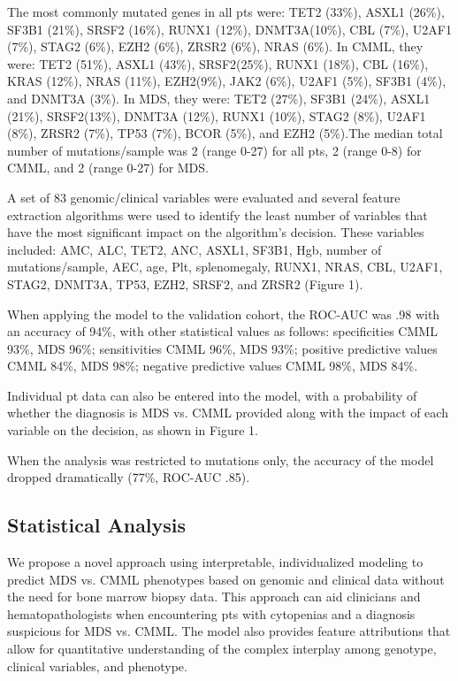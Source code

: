 The most commonly mutated genes in all pts were: TET2 (33\%), ASXL1 (26\%), SF3B1 (21\%), SRSF2 (16\%), RUNX1 (12\%), DNMT3A(10\%), CBL (7\%), U2AF1 (7\%), STAG2 (6\%), EZH2 (6\%), ZRSR2 (6\%), NRAS (6\%). In CMML, they were: TET2 (51\%), ASXL1 (43\%), SRSF2(25\%), RUNX1 (18\%), CBL (16\%), KRAS (12\%), NRAS (11\%), EZH2(9\%), JAK2 (6\%), U2AF1 (5\%), SF3B1 (4\%), and DNMT3A (3\%). In MDS, they were: TET2 (27\%), SF3B1 (24\%), ASXL1 (21\%), SRSF2(13\%), DNMT3A (12\%), RUNX1 (10\%), STAG2 (8\%), U2AF1 (8\%), ZRSR2 (7\%), TP53 (7\%), BCOR (5\%), and EZH2 (5\%).The median total number of mutations/sample was 2 (range 0-27) for all pts, 2 (range 0-8) for CMML, and 2 (range 0-27) for MDS.

A set of 83 genomic/clinical variables were evaluated and several feature extraction algorithms were used to identify the least number of variables that have the most significant impact on the algorithm's decision. These variables included: AMC, ALC, TET2, ANC, ASXL1, SF3B1, Hgb, number of mutations/sample, AEC, age, Plt, splenomegaly, RUNX1, NRAS, CBL, U2AF1, STAG2, DNMT3A, TP53, EZH2, SRSF2, and ZRSR2 (Figure 1).

When applying the model to the validation cohort, the ROC-AUC was .98 with an accuracy of 94\%, with other statistical values as follows: specificities CMML 93\%, MDS 96\%; sensitivities CMML 96\%, MDS 93\%; positive predictive values CMML 84\%, MDS 98\%; negative predictive values CMML 98\%, MDS 84\%.

Individual pt data can also be entered into the model, with a probability of whether the diagnosis is MDS vs. CMML provided along with the impact of each variable on the decision, as shown in Figure 1.

When the analysis was restricted to mutations only, the accuracy of the model dropped dramatically (77\%, ROC-AUC .85).


\subsection{Statistical Analysis}%

We propose a novel approach using interpretable, individualized modeling to predict MDS vs. CMML phenotypes based on genomic and clinical data without the need for bone marrow biopsy data. This approach can aid clinicians and hematopathologists when encountering pts with cytopenias and a diagnosis suspicious for MDS vs. CMML. The model also provides feature attributions that allow for quantitative understanding of the complex interplay among genotype, clinical variables, and phenotype. 
